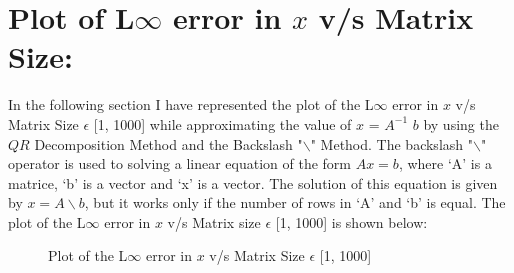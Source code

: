 \documentclass[12pt,a4paper]{article}
\begin{document}
\section{Plot of L$\infty$ error in $x$ v/s Matrix Size:}
In the following section I have represented the plot of the L$\infty$ error in $x$ v/s Matrix Size  $\epsilon$ [1, 1000] while approximating the value of $x$ = $A^{-1}$ $b$ by using the $QR$ Decomposition Method and the Backslash "$\backslash$" Method. The backslash "$\backslash$" operator is used to solving a linear equation of the form $Ax = b$, where ‘A’ is a matrice, ‘b’ is a vector and ‘x’ is a vector. The solution of this equation is given by $x = A \backslash b$, but it works only if the number of rows in ‘A’ and ‘b’ is equal. The plot of the L$\infty$ error in $x$ v/s Matrix size  $\epsilon$ [1, 1000] is shown below:
\begin{figure}[!ht]
	\begin{center}
	\end{center}
	\caption{Plot of the L$\infty$ error in $x$ v/s Matrix Size  $\epsilon$ [1, 1000]}
\end{figure}
\end{document}
